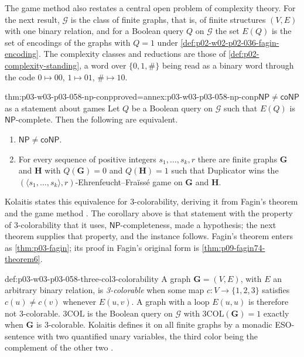 The game method also restates a central open problem of complexity theory.
For the next result, \(\mathcal G\) is the class of finite graphs, that is,
of finite structures \((V,E)\) with one binary relation, and for a Boolean
query \(Q\) on \(\mathcal G\) the set \(E(Q)\) is the set of encodings of
the graphs with \(Q=1\) under
\cref{def:p02-w02-p02-036-fagin-encoding}. The complexity classes and
reductions are those of \cref{def:p02-complexity-standing}, a word over
\(\{0,1,\#\}\) being read as a binary word through the code
\(0\mapsto00\), \(1\mapsto01\), \(\#\mapsto10\).

\begin{hbcorollary}{thm:p03-w03-p03-058-np-conp}{proved=annex:p03-w03-p03-058-np-conp}{\(\mathsf{NP}\ne\mathsf{coNP}\) as a statement about games}
Let \(Q\) be a Boolean query on \(\mathcal G\) such that \(E(Q)\) is
\(\mathsf{NP}\)-complete. Then the following are equivalent.
\begin{enumerate}
\item \(\mathsf{NP}\ne\mathsf{coNP}\).
\item For every sequence of positive integers \(s_1,\ldots,s_k,r\) there are
      finite graphs \(\mathbf G\) and \(\mathbf H\) with
      \(Q(\mathbf G)=0\) and \(Q(\mathbf H)=1\) such that Duplicator wins
      the \((\langle s_1,\ldots,s_k\rangle,r)\)-Ehrenfeucht--Fra\"iss\'e
      game on \(\mathbf G\) and \(\mathbf H\).
\end{enumerate}
\end{hbcorollary}

Kolaitis states this equivalence for 3-colorability, deriving it from
Fagin's theorem and the game method
\cite[Thm.~4.7 and Cor.~4.8, p.~25; Cor.~5.4, p.~27]{Kolaitis2003ExpressivePowerNotes}.
The corollary above is that statement with the property of
3-colorability that it uses, \(\mathsf{NP}\)-completeness, made a
hypothesis; the next theorem supplies that property, and the instance follows.
Fagin's theorem enters as \cref{thm:p03-fagin}; its proof in
Fagin's original form is \cref{thm:p09-fagin74-theorem6}.

\begin{hbdefinition}{def:p03-w03-p03-058-three-col}{3-colorability}
A graph \(\mathbf G=(V,E)\), with \(E\) an arbitrary binary relation, is
\emph{3-colorable} when some map \(c\colon V\to\{1,2,3\}\) satisfies
\(c(u)\ne c(v)\) whenever \(E(u,v)\). A graph with a loop \(E(u,u)\) is
therefore not 3-colorable. \(\mathrm{3COL}\) is the Boolean query on
\(\mathcal G\) with \(\mathrm{3COL}(\mathbf G)=1\) exactly when
\(\mathbf G\) is 3-colorable. Kolaitis defines it on all finite graphs by
a monadic ESO-sentence with two quantified unary variables, the third color
being the complement of the other two
\cite[Example~2.5, p.~7]{Kolaitis2003ExpressivePowerNotes}.
\end{hbdefinition}

